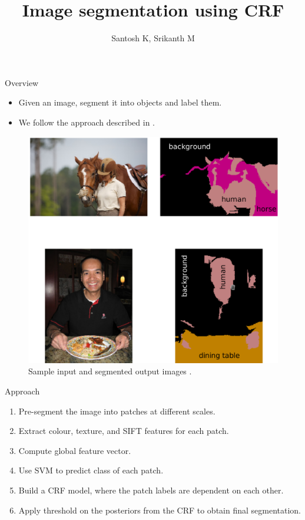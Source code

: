 \documentclass{beamer}
\title{Image segmentation using CRF}
\author{Santosh K, Srikanth M}
\date{}
\begin{document}
\begin{frame}
  \titlepage
\end{frame}


\section{}

\begin{frame}{Overview}

\begin{itemize}
  \item Given an image, segment it into objects and label them.
  \item We follow the approach described in \cite{icml_2009}.
\end{itemize}

\begin{figure}[!hbp]
    \centering
    \includegraphics[width=0.5\linewidth]{images/ex}
    \caption{Sample input and segmented output images \cite{icml_2009}.}
    \label{fig_ex}
\end{figure}

\end{frame}

\begin{frame}{Approach}
  \begin{enumerate}
    \item Pre-segment the image into patches at different scales.
    \item Extract colour, texture, and SIFT features for each patch.
    \item Compute global feature vector.
    \item Use SVM to predict class of each patch.
    \item Build a CRF model, where the patch labels are dependent on each other.
    \item Apply threshold on the posteriors from the CRF to obtain final segmentation.        
  \end{enumerate}
\end{frame}
\end{document}
